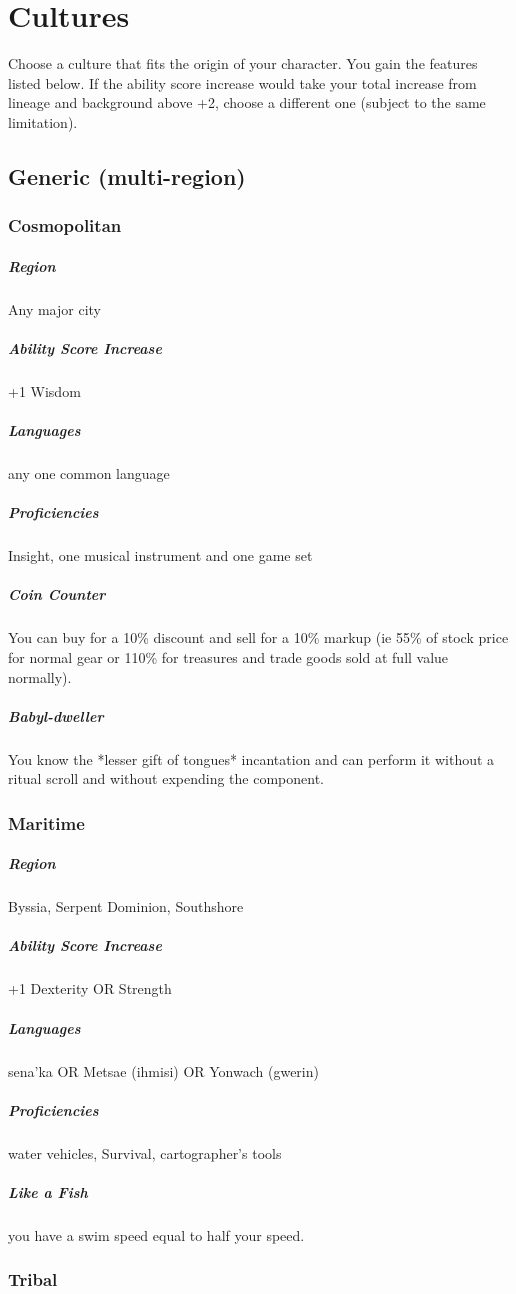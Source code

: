 \section{Cultures}
Choose a culture that fits the origin of your character.  You gain the features listed below. If the ability score increase would take your total increase from lineage and background above +2, choose a different one (subject to the same limitation).

\subsection{Generic (multi-region)}
\subsubsection{Cosmopolitan}

\subparagraph*{Region} Any major city

\subparagraph*{Ability Score Increase} +1 Wisdom

\subparagraph*{Languages} any one common language

\subparagraph*{Proficiencies} Insight, one musical instrument and one game set

\subparagraph*{Coin Counter} You can buy for a 10\% discount and sell for a 10\% markup (ie 55\% of stock price for normal gear or 110\% for treasures and trade goods sold at full value normally).

\subparagraph*{Babyl-dweller} You know the *lesser gift of tongues* incantation and can perform it without a ritual scroll and without expending the component.

\subsubsection{Maritime}

\subparagraph*{Region} Byssia, Serpent Dominion, Southshore

\subparagraph*{Ability Score Increase} +1 Dexterity OR Strength

\subparagraph*{Languages} sena'ka OR Metsae (ihmisi) OR Yonwach (gwerin)

\subparagraph*{Proficiencies} water vehicles, Survival, cartographer's tools

\subparagraph*{Like a Fish} you have a swim speed equal to half your speed.

\subsubsection{Tribal}

